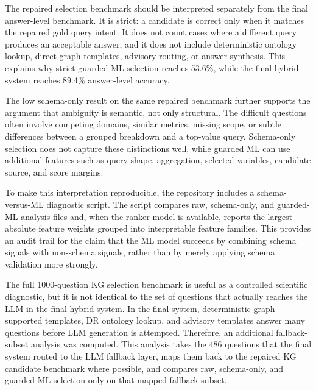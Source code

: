 \documentclass[
  12pt,
  english,
  oneside]{report}
\begin{document}
The repaired selection benchmark should be interpreted separately from the final answer-level benchmark. It is strict: a candidate is correct only when it matches the repaired gold query intent. It does not count cases where a different query produces an acceptable answer, and it does not include deterministic ontology lookup, direct graph templates, advisory routing, or answer synthesis. This explains why strict guarded-ML selection reaches 53.6\%, while the final hybrid system reaches 89.4\% answer-level accuracy.

The low schema-only result on the same repaired benchmark further supports the argument that ambiguity is semantic, not only structural. The difficult questions often involve competing domains, similar metrics, missing scope, or subtle differences between a grouped breakdown and a top-value query. Schema-only selection does not capture these distinctions well, while guarded ML can use additional features such as query shape, aggregation, selected variables, candidate source, and score margins.

To make this interpretation reproducible, the repository includes a schema-versus-ML diagnostic script. The script compares raw, schema-only, and guarded-ML analysis files and, when the ranker model is available, reports the largest absolute feature weights grouped into interpretable feature families. This provides an audit trail for the claim that the ML model succeeds by combining schema signals with non-schema signals, rather than by merely applying schema validation more strongly.

The full 1000-question KG selection benchmark is useful as a controlled scientific diagnostic, but it is not identical to the set of questions that actually reaches the LLM in the final hybrid system. In the final system, deterministic graph-supported templates, DR ontology lookup, and advisory templates answer many questions before LLM generation is attempted. Therefore, an additional fallback-subset analysis was computed. This analysis takes the 486 questions that the final system routed to the LLM fallback layer, maps them back to the repaired KG candidate benchmark where possible, and compares raw, schema-only, and guarded-ML selection only on that mapped fallback subset.
\end{document}
